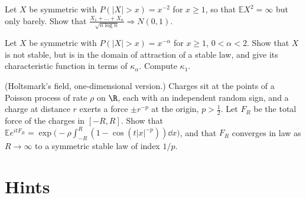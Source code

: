 \begin{exercise}[$\star\star$]\label{ex:boundary}
Let $X$ be symmetric with $P(|X|>x)=x^{-2}$ for $x\ge1$, so that $\mathbb EX^2=\infty$ but only barely. Show that $\frac{X_1+\dots+X_n}{\sqrt{n\log n}}\Rightarrow N(0,1)$.
\end{exercise}

\begin{exercise}[$\star\star$]\label{ex:paretodomain}
Let $X$ be symmetric with $P(|X|>x)=x^{-\alpha}$ for $x\ge1$, $0<\alpha<2$. Show that $X$ is not stable, but is in the domain of attraction of a stable law,
and give its characteristic function in terms of $\kappa_\alpha$. Compute $\kappa_1$.
\end{exercise}

\begin{exercise}[$\star\star\star$]\label{ex:holtsmark}
(Holtsmark's field, one-dimensional version.) Charges sit at the points of a Poisson process of rate $\rho$ on $\R$, each with an independent random sign, and a
charge at distance $r$ exerts a force $\pm r^{-p}$ at the origin, $p>\frac12$. Let $F_R$ be the total force of the charges in $[-R,R]$. Show that
$\mathbb Ee^{itF_R}=\exp\bigl(-\rho\int_{-R}^R(1-\cos(t|x|^{-p}))\dd x\bigr)$, and that $F_R$ converges in law as $R\to\infty$ to a symmetric stable law of index $1/p$.
\end{exercise}

\section{Hints}

